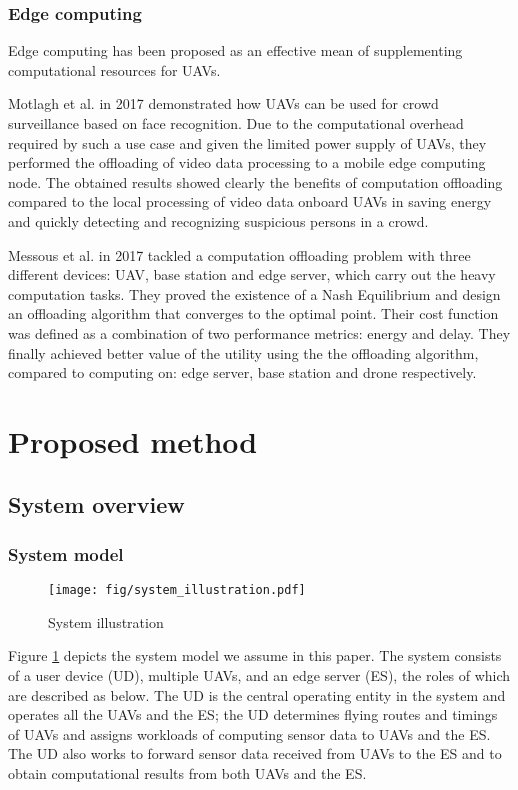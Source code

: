 \documentclass{ieeeaccess}
\begin{document}
\subsubsection{Edge computing}
Edge computing has been proposed as an effective mean of supplementing computational resources for UAVs\cite{Motlagh2017,Messous2017}.

Motlagh et al. in 2017 demonstrated how UAVs can be used for crowd surveillance based on face recognition. 
Due to the computational overhead required by such a use case and given the limited power supply of UAVs, they performed the offloading of video data processing to a mobile edge computing node.
The obtained results showed clearly the benefits of computation offloading compared to the local processing of video data onboard UAVs in saving energy and quickly detecting and recognizing suspicious persons in a crowd.

Messous et al. in 2017 tackled a computation offloading problem with three different devices: UAV, base station and edge server, which carry out the heavy computation tasks.
They proved the existence of a Nash Equilibrium and design an offloading algorithm that converges to the optimal point.
Their cost function was defined as a combination of two performance metrics: energy and delay.
They finally achieved better value of the utility using the the offloading algorithm, compared to computing on: edge server, base station and drone respectively.

\section{Proposed method}\label{method}

\subsection{System overview}\label{sys}
\subsubsection{System model}\label{sysmo}

\begin{figure}[htbp]
\begin{center}
\texttt{[image: fig/system\_illustration.pdf]}
\caption{System illustration}
\label{model}
\end{center}
\end{figure}

Figure \ref{model} depicts the system model we assume in this paper. 
The system consists of a user device (UD), multiple UAVs, and an edge server (ES), the roles of which are described as below.
%
The UD is the central operating entity in the system and operates all the UAVs and the ES; the UD determines flying routes and timings of UAVs and assigns workloads of computing sensor data to UAVs and the ES.
%
The UD also works to forward sensor data received from UAVs to the ES and to obtain computational results from both UAVs and the ES.
\end{document}
